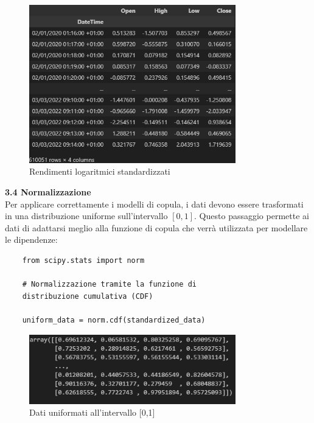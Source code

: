 \documentclass[a4paper,12pt]{article}
\begin{document}
\begin{figure}[h] %
	\centering %
	\includegraphics[width=0.8\textwidth]{dfnormal.png} %
	\caption{Rendimenti logaritmici standardizzati} %
	\label{fig:immagine} %
\end{figure}
\newpage
\noindent\textbf{3.4 Normalizzazione} \\

\noindent Per applicare correttamente i modelli di copula, i dati devono essere trasformati in una distribuzione uniforme sull'intervallo $[0,1]$. Questo passaggio permette ai dati di adattarsi meglio alla funzione di copula che verrà utilizzata per modellare le dipendenze:\\
\begin{verbatim}
	from scipy.stats import norm
	
	# Normalizzazione tramite la funzione di 
	distribuzione cumulativa (CDF)
	
	uniform_data = norm.cdf(standardized_data)
\end{verbatim}

\begin{figure}[h] %
	\centering %
	\includegraphics[width=0.8\textwidth]{norm.png} %
	\caption{Dati uniformati all'intervallo [0,1]} %
	\label{fig:immagine} %
\end{figure}
\end{document}

